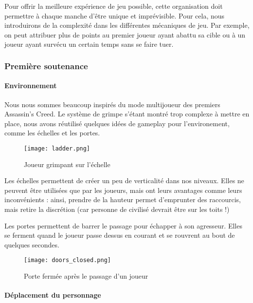 			Pour offrir la meilleure expérience de jeu possible, cette organisation doit permettre à chaque manche d'être unique et imprévisible.
			Pour cela, nous introduirons de la complexité dans les différentes mécaniques de jeu. Par exemple, on peut attribuer plus de points
			au premier joueur ayant abattu sa cible ou à un joueur ayant survécu un certain temps sans se faire tuer.


			
	\subsubsection{Première soutenance}

        \paragraph{Environnement}

            Nous nous sommes beaucoup inspirés du mode multijoueur des premiers Assassin's Creed. Le système de grimpe s'étant 
			montré trop complexe à mettre en place, nous avons réutilisé quelques idées de gameplay pour l'environement, comme les échelles et les portes.

            \begin{figure}[hbt!]
                \centering
                \texttt{[image: ladder.png]}
                \caption{Joueur grimpant sur l'échelle}
            \end{figure}
			\FloatBarrier

            Les échelles permettent de créer un peu de verticalité dans nos niveaux.
            Elles ne peuvent être utilisées que par les joueurs, mais ont leurs avantages comme leurs inconvénients : ainsi,
            prendre de la hauteur permet d'emprunter des raccourcis, mais retire la discrétion (car personne de civilisé devrait être sur les toits !)
            
            Les portes permettent de barrer le passage pour échapper à son agresseur.
            Elles se ferment quand le joueur passe dessus en courant
            et se rouvrent au bout de quelques secondes.

            \begin{figure}[ht]
                \centering
                \texttt{[image: doors\_closed.png]}
                \caption{Porte fermée après le passage d'un joueur}
            \end{figure}
			\FloatBarrier


        \paragraph{Déplacement du personnage}
            
